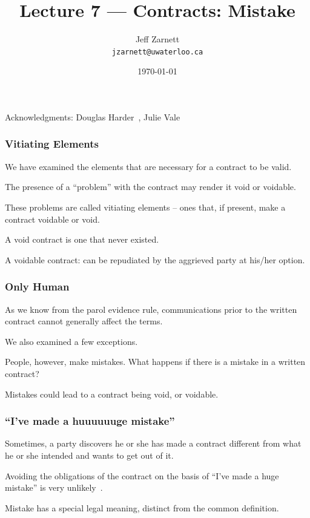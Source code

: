 

\title{Lecture 7 --- Contracts: Mistake }

\author{Jeff Zarnett \\ \small \texttt{jzarnett@uwaterloo.ca}}
\date{\today}




\begin{frame}
  \titlepage

\begin{center}
  \small{Acknowledgments: Douglas Harder~\cite{dwh}, Julie Vale~\cite{jv}}
  \end{center}
\end{frame}





\begin{frame}
\frametitle{Vitiating Elements}

We have examined the elements that are necessary for a contract to be valid.

The presence of a ``problem'' with the contract may render it void or voidable.

These problems are called \alert{vitiating} elements -- ones that, if present, make a contract voidable or void.

A void contract is one that never existed.

A \alert{voidable} contract: can be repudiated by the aggrieved party at his/her option.

\end{frame}


\begin{frame}
\frametitle{Only Human}

As we know from the parol evidence rule, communications prior to the written contract cannot generally affect the terms.

We also examined a few exceptions. 

People, however, make mistakes. What happens if there is a mistake in a written contract?

Mistakes could lead to a contract being void, or voidable.

\end{frame}



\begin{frame}
\frametitle{``I've made a huuuuuuge mistake''}

Sometimes, a party discovers he or she has made a contract different from what he or she intended and wants to get out of it.

Avoiding the obligations of the contract on the basis of ``I've made a huge mistake'' is very unlikely~\cite{lba}.

Mistake has a special legal meaning, distinct from the common definition.

\end{frame}



